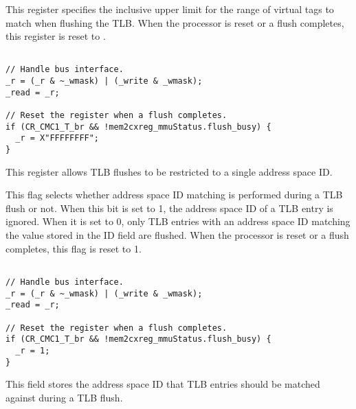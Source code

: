 This register specifies the inclusive upper limit for the range of virtual tags 
to match when flushing the TLB. When the processor is reset or a flush
completes, this register is reset to .

\declaration{}
\implementation{}
\begin{lstlisting}

// Handle bus interface.
_r = (_r & ~_wmask) | (_write & _wmask);
_read = _r;

// Reset the register when a flush completes.
if (CR_CMC1_T_br && !mem2cxreg_mmuStatus.flush_busy) {
  _r = X"FFFFFFFF";
}

\end{lstlisting}


This register allows TLB flushes to be restricted to a single address space ID.

This flag selects whether address space ID matching is performed during a TLB 
flush or not. When this bit is set to 1, the address space ID of a TLB entry is 
ignored. When it is set to 0, only TLB entries with an address space ID matching 
the value stored in the ID field are flushed. When the processor is reset or a
flush completes, this flag is reset to 1.

\declaration{}
\implementation{}
\begin{lstlisting}

// Handle bus interface.
_r = (_r & ~_wmask) | (_write & _wmask);
_read = _r;

// Reset the register when a flush completes.
if (CR_CMC1_T_br && !mem2cxreg_mmuStatus.flush_busy) {
  _r = 1;
}

\end{lstlisting}

This field stores the address space ID that TLB entries should be matched
against during a TLB flush.

